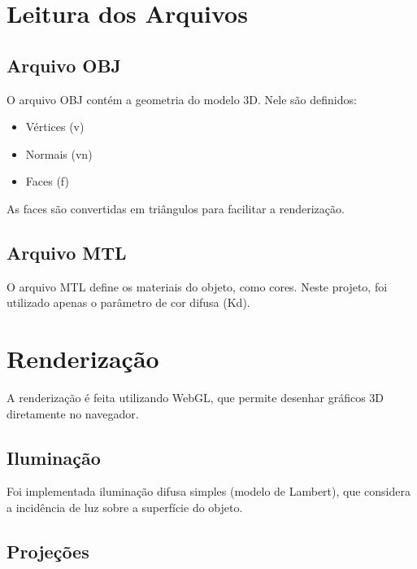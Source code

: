 \documentclass[12pt,a4paper]{article}
\begin{document}
\section{Leitura dos Arquivos}

\subsection{Arquivo OBJ}

O arquivo OBJ contém a geometria do modelo 3D. Nele são definidos:

\begin{itemize}
    \item Vértices (v)
    \item Normais (vn)
    \item Faces (f)
\end{itemize}

As faces são convertidas em triângulos para facilitar a renderização.

\subsection{Arquivo MTL}

O arquivo MTL define os materiais do objeto, como cores. Neste projeto, foi utilizado apenas o parâmetro de cor difusa (Kd).

\section{Renderização}

A renderização é feita utilizando WebGL, que permite desenhar gráficos 3D diretamente no navegador.

\subsection{Iluminação}

Foi implementada iluminação difusa simples (modelo de Lambert), que considera a incidência de luz sobre a superfície do objeto.

\subsection{Projeções}
\end{document}
